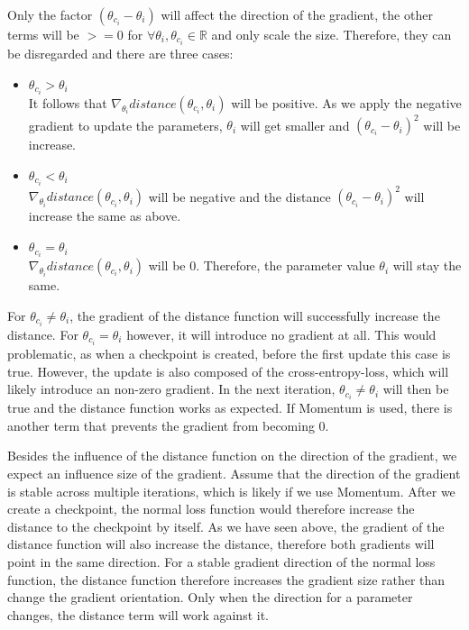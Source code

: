 Only the factor $(\theta_{c_i} - \theta_i)$ will affect the direction of the
gradient, the other terms will be $>=0$ for $\forall \theta_i , \theta_{c_i}\in
\mathbb{R}$ and only scale the size. Therefore, they can be disregarded and
there are three cases:
\begin{itemize}
    \item $\theta_{c_i} > \theta_i$\\
        It follows that $\nabla_{\theta_i} distance(\theta_{c_i}, \theta_i)$
        will be positive. As we apply the negative gradient to update the
        parameters, $\theta_i$ will get smaller and  $(\theta_{c_i} - \theta_i)^2$
        will be increase.
    \item $\theta_{c_i} < \theta_i$\\
        $\nabla_{\theta_i} distance(\theta_{c_i}, \theta_i)$ will be negative
        and the distance $(\theta_{c_i} - \theta_i)^2$ will increase the same as
        above.
    \item $\theta_{c_i} = \theta_i$\\
        $\nabla_{\theta_i} distance(\theta_{c_i}, \theta_i)$ will be 0.
        Therefore, the parameter value $\theta_i$ will stay the same.
\end{itemize} 

For $\theta_{c_i} \neq \theta_i$, the gradient of the distance function will
successfully increase the distance. For $\theta_{c_i} = \theta_i$ however, it
will introduce no gradient at all. This would problematic, as when a checkpoint
is created, before the first update this case is true. However, the update is
also composed of the cross-entropy-loss, which will likely introduce an non-zero
gradient. In the next iteration, $\theta_{c_i} \neq \theta_i$ will then be true
and the distance function works as expected. If Momentum is used, there is
another term that prevents the gradient from becoming 0.


Besides the influence of the distance function on the direction of the gradient,
we expect an influence size of the gradient. Assume that the direction of the
gradient is stable across multiple iterations, which is likely if we use
Momentum. After we create a checkpoint, the normal loss function would therefore
increase the distance to the checkpoint by itself. As we have seen above, the
gradient of the distance function will also increase the distance, therefore
both gradients will point in the same direction. For a stable gradient direction
of the normal loss function, the distance function therefore increases the
gradient size rather than change the gradient orientation. Only when the
direction for a parameter changes, the distance term will work against it.

